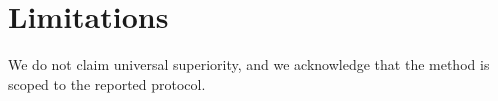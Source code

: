 \documentclass{article}
\begin{document}
\begin{abstract}
The paper presents a scoped method for the target benchmark.
\end{abstract}
\section{Limitations}
We do not claim universal superiority, and we acknowledge that the method is scoped to the reported protocol.
\end{document}
